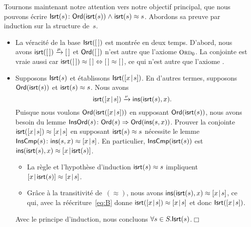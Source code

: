 Tournons maintenant notre attention vers notre objectif principal, que
nous pouvons écrire \(\textsf{Isrt}({s})\colon \textsf{Ord}({\textsf{isrt}(s)})
\mathrel{\wedge} \textsf{isrt}(s) \approx
s\). Abordons sa preuve par induction sur
la structure de~\(s\).
\begin{itemize}

  \item La véracité de la base \(\textsf{Isrt}({[\,]})\) est montrée en deux
  temps. D'abord, nous avons \(\textsf{isrt}([\,])
  \xrightarrow{\smash{\mu}} [\,]\) et \(\textsf{Ord}({[\,]})\) n'est autre
  que l'axiome \(\TirName{Ord}_0\). La conjointe est vraie aussi car
  \(\textsf{isrt}([\,]) \approx [\,] \Leftrightarrow [\,] \approx [\,]\), ce
  qui n'est autre que l'axiome .

  \item Supposons \(\textsf{Isrt}({s})\) et établissons
  \(\textsf{Isrt}({[{x}\!\mid\!{s}]})\). En d'autres termes, supposons
  \(\textsf{Ord}({\textsf{isrt}(s)})\) et \(\textsf{isrt}(s) \approx s\). Nous
  avons
  \begin{equation}
    \textsf{isrt}([{x}\!\mid\!{s}]) \xrightarrow{\smash{\nu}}
    \textsf{ins}(\textsf{isrt}(s),x).\label{eq:B}
  \end{equation}
  Puisque nous voulons \(\textsf{Ord}({\textsf{isrt}([{x}\!\mid\!{s}])})\) en
  supposant \(\textsf{Ord}({\textsf{isrt}(s)})\), nous avons besoin du lemme
  \(\textsf{InsOrd}({s}) \colon \textsf{Ord}({s}) \Rightarrow
  \textsf{Ord}({\textsf{ins}(s,x)})\).
  Prouver la conjointe \(\textsf{isrt}([{x}\!\mid\!{s}]) \approx [{x}\!\mid\!{s}]\)
  en supposant \(\textsf{isrt}(s) \approx s\) nécessite le lemme
  \(\textsf{InsCmp}({s}) \colon \textsf{ins}(s,x) \approx [{x}\!\mid\!{s}]\). En
  particulier, \(\textsf{InsCmp}({\textsf{isrt}(s)})\) est
  \(\textsf{ins}(\textsf{isrt}(s),x) \approx [{x}\!\mid\!{\textsf{isrt}(s)}]\).
  \begin{itemize}

  \item La règle  et l'hypothèse d'induction
    \(\textsf{isrt}(s) \approx s\) impliquent \([{x}\!\mid\!{\textsf{isrt}(s)}]
    \approx [{x}\!\mid\!{s}]\).

  \item Grâce à la transitivité de~\((\approx)\), nous avons
    \(\textsf{ins}(\textsf{isrt}(s),x) \approx [{x}\!\mid\!{s}]\), ce qui, avec
    la réécriture~\eqref{eq:B} donne \(\textsf{isrt}([{x}\!\mid\!{s}]) \approx
    [{x}\!\mid\!{s}]\) et donc \(\textsf{Isrt}({[{x}\!\mid\!{s}]})\).

  \end{itemize}
  Avec le principe d'induction, nous concluons \(\forall s \in
  S.\textsf{Isrt}({s})\).\hfill\(\Box\)

\end{itemize}

